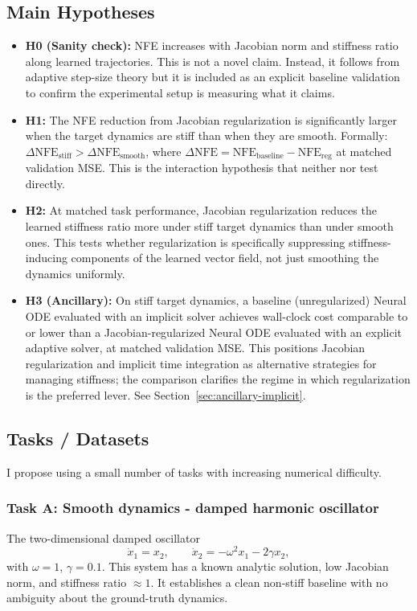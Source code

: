\documentclass[11pt]{article}
\begin{document}
\subsection{Main Hypotheses}
\begin{itemize}
    \item \textbf{H0 (Sanity check):} NFE increases with Jacobian norm and stiffness ratio along learned trajectories. This is not a novel claim. Instead, it follows from adaptive step-size theory but it is included as an explicit baseline validation to confirm the experimental setup is measuring what it claims.
    \item \textbf{H1:} The NFE reduction from Jacobian regularization is significantly larger when the target dynamics are stiff than when they are smooth. Formally: $\Delta\text{NFE}_{\text{stiff}} > \Delta\text{NFE}_{\text{smooth}}$, where $\Delta\text{NFE} = \text{NFE}_{\text{baseline}} - \text{NFE}_{\text{reg}}$ at matched validation MSE. This is the interaction hypothesis that neither \citet{finlay2020trainnode} nor \citet{kim2021stiffnode} test directly.

    \item \textbf{H2:} At matched task performance, Jacobian regularization reduces the learned stiffness ratio more under stiff target dynamics than under smooth ones. This tests whether regularization is specifically suppressing stiffness-inducing components of the learned vector field, not just smoothing the dynamics uniformly.

    \item \textbf{H3 (Ancillary):} On stiff target dynamics, a baseline (unregularized) Neural ODE evaluated with an implicit solver achieves wall-clock cost comparable to or lower than a Jacobian-regularized Neural ODE evaluated with an explicit adaptive solver, at matched validation MSE. This positions Jacobian regularization and implicit time integration as alternative strategies for managing stiffness; the comparison clarifies the regime in which regularization is the preferred lever. See Section~\ref{sec:ancillary-implicit}.
\end{itemize}

\subsection{Tasks / Datasets}

I propose using a small number of tasks with increasing numerical difficulty.

\subsubsection{Task A: Smooth dynamics - damped harmonic oscillator}
The two-dimensional damped oscillator
\begin{equation}
\dot{x}_1 = x_2, \qquad \dot{x}_2 = -\omega^2 x_1 - 2\gamma x_2,
\end{equation}
with $\omega = 1$, $\gamma = 0.1$. This system has a known analytic solution, low Jacobian norm, and stiffness ratio $\approx 1$. It establishes a clean non-stiff baseline with no ambiguity about the ground-truth dynamics.
\end{document}
